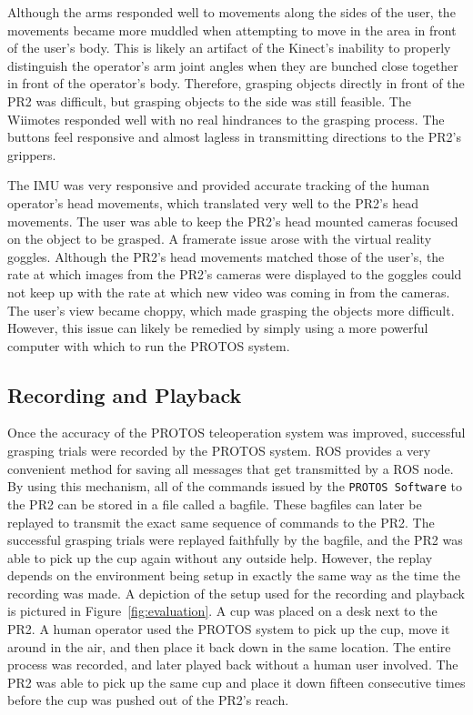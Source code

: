 \documentclass{sig-alternate}
\begin{document}
\indent Although the arms responded well to movements along the sides of the user, the movements became more
muddled when attempting to move in the area in front of the user's body. This is likely an artifact of the Kinect's inability to properly distinguish the operator's arm 
joint angles when they are bunched close together in front of the operator's body. Therefore, grasping objects directly in front of the PR2 was difficult, but grasping
objects to the side was still feasible. The Wiimotes responded well with no real hindrances to the grasping process. The buttons feel responsive and almost lagless in
transmitting directions to the PR2's grippers.

\indent The IMU was very responsive and provided accurate tracking of the human operator's head movements, which translated very well to the PR2's head movements. The user 
was able to keep the PR2's head mounted cameras focused on the object to be grasped. A framerate issue arose with the virtual reality goggles. Although the PR2's head movements
matched those of the user's, the rate at which images from the PR2's cameras were displayed to the goggles could not keep up with the rate at which new video was coming
in from the cameras. The user's view became choppy, which made grasping the objects more difficult. However, this issue can likely be remedied by simply using a more
powerful computer with which to run the PROTOS system.

\subsection{Recording and Playback}
\indent Once the accuracy of the PROTOS teleoperation system was improved, successful grasping trials were recorded by the PROTOS system. ROS provides a very
convenient method for saving all messages that get transmitted by a ROS node. By using this mechanism, all of the commands issued by the {\tt PROTOS Software} to the PR2
can be stored in a file called a bagfile. These bagfiles can later be replayed to transmit the exact same sequence of commands to the PR2. The successful grasping trials
were replayed faithfully by the bagfile, and the PR2 was able to pick up the cup again without any outside help. However, the replay depends on the environment being setup
in exactly the same way as the time the recording was made. A depiction of the setup used for the recording and playback is pictured in Figure~\ref{fig:evaluation}. A cup
was placed on a desk next to the PR2. A human operator used the PROTOS system to pick up the cup, move it around in the air, and then place it back down in the same location.
The entire process was recorded, and later played back without a human user involved. The PR2 was able to pick up the same cup and place it down fifteen consecutive times
before the cup was pushed out of the PR2's reach.
\end{document}
